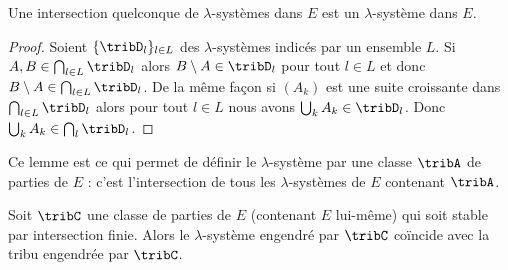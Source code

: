 \begin{lemma}
	Une intersection quelconque de \( \lambda\)-systèmes dans \( E\) est un \( \lambda\)-système dans \( E\).
\end{lemma}

\begin{proof}
	Soient \( \{ \tribD_l \}_{l\in L}\) des \( \lambda\)-systèmes indicés par un ensemble \( L\). Si \( A,B\in\bigcap_{l\in L}\tribD_l\) alors \( B\setminus A\in\tribD_l\) pour tout \( l\in L\) et donc \( B\setminus A\in\bigcap_{l\in L}\tribD_l\). De la même façon si \( (A_k)\) est une suite croissante dans \( \bigcap_{l\in L}\tribD_l\) alors pour tout \( l\in L\) nous avons \( \bigcup_kA_k\in\tribD_l\). Donc \( \bigcup_kA_k\in\bigcap_l\tribD_l\).
\end{proof}
Ce lemme est ce qui permet de définir le \( \lambda\)-système  par une classe \( \tribA\) de parties de \( E\) : c'est l'intersection de tous les \( \lambda\)-systèmes de \( E\) contenant \( \tribA\).

\begin{lemma}   \label{LemLUmopaZ}
	Soit \( \tribC\) une classe de parties de \( E\) (contenant \( E\) lui-même) qui soit stable par intersection finie. Alors le \( \lambda\)-système engendré par \( \tribC\) coïncide avec la tribu engendrée par \( \tribC\).
\end{lemma}

